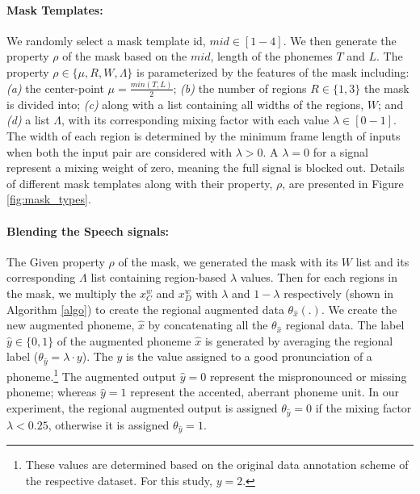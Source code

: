 \documentclass{INTERSPEECH2023}
\begin{document}
\paragraph*{Mask Templates:}  
We randomly select a mask template id, $mid \in [1-4]$. We then generate the property $\rho$ of the mask based on the $mid$, length of the phonemes $T$ and $L$. The property $\rho \in \{\mu, R, W, \Lambda\}$ is parameterized by the features of the mask including: \textit{(a)} the center-point $\mu = \frac{min(T,L)}{2}$; \textit{(b)} the number of regions $R\in \{1, 3\}$ the mask is divided into; \textit{(c)} along with a list containing all widths of the regions, $W$; and \textit{(d)} a list $\Lambda$, with its corresponding mixing factor with each value $\lambda \in [0-1]$. The width of each region is determined by the minimum frame length of inputs when both the input pair are considered with $\lambda > 0$. A $\lambda = 0$ for a signal represent a mixing weight of zero, meaning the full signal is blocked out.
Details of different mask templates along with their property, $\rho$, are presented in Figure \ref{fig:mask_types}.  



\paragraph*{Blending the Speech signals:} 
The Given property $\rho$ of the mask, we generated the mask with its $W$ list and its corresponding $\Lambda$ list containing region-based $\lambda$ values. Then for each regions in the mask, we multiply the $x{_C^w}$ and $x{_D^w}$ with $\lambda$ and $1- \lambda$ respectively (shown in Algorithm \ref{algo}) to create the regional augmented data $\theta_{\hat{x}}(.)$. We create the new augmented phoneme, $\hat{x}$ by concatenating all the $\theta_{\hat{x}}$ regional data.
The label $\hat{y} \in \{0,1\}$ of the augmented phoneme $\hat{x}$ is generated by averaging the regional label ($\theta_{\hat{y}} = \lambda \cdot y$). The $y$ is the value assigned to a good pronunciation of a phoneme.\footnote{These values are determined based on the original data annotation scheme of the respective dataset. For this study, $y=2$.} The augmented output $\hat{y}=0$ represent the mispronounced or missing phoneme; whereas $\hat{y}=1$ represent the accented, aberrant phoneme unit. In our experiment, the regional augmented output is assigned $\theta_{\hat{y}} = 0$ if the mixing factor $\lambda<0.25$, otherwise it is assigned $\theta_{\hat{y}} = 1$.
\end{document}
